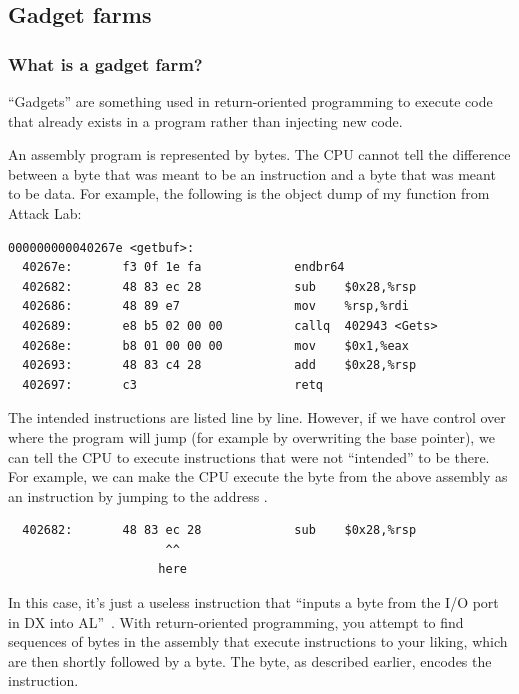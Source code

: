 \subsection{Gadget farms}

\subsubsection{What is a gadget farm?}

``Gadgets'' are something used in return-oriented programming to execute code that already exists in a program rather than injecting new code.

An assembly program is represented by bytes. The CPU cannot tell the difference between a byte that was meant to be an instruction and a byte that was meant to be data. For example, the following is the object dump of my  function from Attack Lab:

\begin{verbatim}
000000000040267e <getbuf>:
  40267e:       f3 0f 1e fa             endbr64
  402682:       48 83 ec 28             sub    $0x28,%rsp
  402686:       48 89 e7                mov    %rsp,%rdi
  402689:       e8 b5 02 00 00          callq  402943 <Gets>
  40268e:       b8 01 00 00 00          mov    $0x1,%eax
  402693:       48 83 c4 28             add    $0x28,%rsp
  402697:       c3                      retq
\end{verbatim}

The intended instructions are listed line by line. However, if we have control over where the program will jump (for example by overwriting the base pointer), we can tell the CPU to execute instructions that were not ``intended'' to be there. For example, we can make the CPU execute the  byte from the above assembly as an instruction by jumping to the address .

\begin{verbatim}
  402682:       48 83 ec 28             sub    $0x28,%rsp
                      ^^
                     here
\end{verbatim}

In this case, it's just a useless instruction that ``inputs a byte from the I/O port in DX into AL''~\cite{x86-cli-ins}. With return-oriented programming, you attempt to find sequences of bytes in the assembly that execute instructions to your liking, which are then shortly followed by a  byte. The  byte, as described earlier, encodes the  instruction. 


